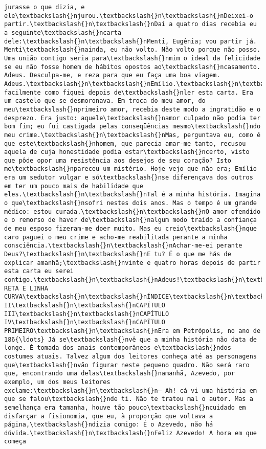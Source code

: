 \begin{Verbatim}[commandchars=\\\{\}]
jurasse o que dizia, e ele\textbackslash{}njurou.\textbackslash{}n\textbackslash{}nDeixei-o partir.\textbackslash{}n\textbackslash{}nDaí a quatro dias recebia eu a seguinte\textbackslash{}ncarta dele:\textbackslash{}n\textbackslash{}nMenti, Eugênia; vou partir já. Menti\textbackslash{}nainda, eu não volto. Não volto porque não posso. Uma união contigo seria para\textbackslash{}nmim o ideal da felicidade se eu não fosse homem de hábitos opostos ao\textbackslash{}ncasamento. Adeus. Desculpa-me, e reza para que eu faça uma boa viagem. Adeus.\textbackslash{}n\textbackslash{}nEmílio.\textbackslash{}n\textbackslash{}nAvalias facilmente como fiquei depois de\textbackslash{}nler esta carta. Era um castelo que se desmoronava. Em troca do meu amor, do meu\textbackslash{}nprimeiro amor, recebia deste modo a ingratidão e o desprezo. Era justo: aquele\textbackslash{}namor culpado não podia ter bom fim; eu fui castigada pelas conseqüências mesmo\textbackslash{}ndo meu crime.\textbackslash{}n\textbackslash{}nMas, perguntava eu, como é que este\textbackslash{}nhomem, que parecia amar-me tanto, recusou aquela de cuja honestidade podia estar\textbackslash{}ncerto, visto que pôde opor uma resistência aos desejos de seu coração? Isto me\textbackslash{}npareceu um mistério. Hoje vejo que não era; Emílio era um sedutor vulgar e só\textbackslash{}nse diferençava dos outros em ter um pouco mais de habilidade que eles.\textbackslash{}n\textbackslash{}nTal é a minha história. Imagina o que\textbackslash{}nsofri nestes dois anos. Mas o tempo é um grande médico: estou curada.\textbackslash{}n\textbackslash{}nO amor ofendido e o remorso de haver de\textbackslash{}nalgum modo traído a confiança de meu esposo fizeram-me doer muito. Mas eu creio\textbackslash{}nque caro paguei o meu crime e acho-me reabilitada perante a minha consciência.\textbackslash{}n\textbackslash{}nAchar-me-ei perante Deus?\textbackslash{}n\textbackslash{}nE tu? É o que me hás de explicar amanhã;\textbackslash{}nvinte e quatro horas depois de partir esta carta eu serei contigo.\textbackslash{}n\textbackslash{}nAdeus!\textbackslash{}n\textbackslash{}nLINHA RETA E LINHA CURVA\textbackslash{}n\textbackslash{}nÍNDICE\textbackslash{}n\textbackslash{}nCAPÍTULO\textbackslash{}nPRIMEIRO\textbackslash{}n\textbackslash{}nCAPÍTULO II\textbackslash{}n\textbackslash{}nCAPÍTULO III\textbackslash{}n\textbackslash{}nCAPÍTULO IV\textbackslash{}n\textbackslash{}nCAPÍTULO PRIMEIRO\textbackslash{}n\textbackslash{}nEra em Petrópolis, no ano de 186{\ldots} Já se\textbackslash{}nvê que a minha história não data de longe. É tomada dos anais contemporâneos e\textbackslash{}ndos costumes atuais. Talvez algum dos leitores conheça até as personagens que\textbackslash{}nvão figurar neste pequeno quadro. Não será raro que, encontrando uma delas\textbackslash{}namanhã, Azevedo, por exemplo, um dos meus leitores exclame:\textbackslash{}n\textbackslash{}n— Ah! cá vi uma história em que se falou\textbackslash{}nde ti. Não te tratou mal o autor. Mas a semelhança era tamanha, houve tão pouco\textbackslash{}ncuidado em disfarçar a fisionomia, que eu, à proporção que voltava a página,\textbackslash{}ndizia comigo: É o Azevedo, não há dúvida.\textbackslash{}n\textbackslash{}nFeliz Azevedo! A hora em que começa 
\end{Verbatim}
